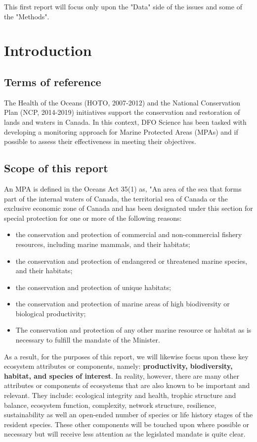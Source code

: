 \documentclass[letterpaper,portrait,11pt]{scrartcl}
\numberwithin{equation}{section}		%
\numberwithin{figure}{section}		%
\numberwithin{table}{section}				%
\begin{document}
This first report will focus only upon the "Data" side of the issues and some of the "Methods". 


\section{Introduction}

\subsection{Terms of reference}
The Health of the Oceans (HOTO, 2007-2012) and the National Conservation Plan (NCP, 2014-2019) initiatives support the conservation and restoration of lands and waters in Canada. In this context, DFO Science has been tasked with developing a monitoring approach for Marine Protected Areas (MPAs) and if possible to assess their effectiveness in meeting their objectives. 

\subsection{Scope of this report}
An MPA is defined in the Oceans Act 35(1) as, "An area of the sea that forms part of the internal waters of Canada, the territorial sea of Canada or the exclusive economic zone of Canada and has been designated under this section for special protection for one or more of the following reasons: 

\begin{itemize}
  \item the conservation and protection of commercial and non-commercial fishery resources, including marine mammals, and their habitats; 
  \item the conservation and protection of endangered or threatened marine species, and their habitats; 
  \item the conservation and protection of unique habitats; 
  \item the conservation and protection of marine areas of high biodiversity or biological productivity; 
  \item The conservation and protection of any other marine resource or habitat as is necessary to fulfill the mandate of the Minister.
\end{itemize}

As a result, for the purposes of this report, we will likewise focus upon these key ecosystem attributes or components, namely: \textbf{productivity, biodiversity, habitat, and  species of interest}. In reality, however, there are many other attributes or components of ecosystems that are also known to be important and relevant. They include: ecological integrity and health, trophic structure and balance, ecosystem function, complexity, network structure, resilience, sustainability as well an open-ended number of species or life history stages of the resident species. These other components will be touched upon where possible or necessary but will receive less attention as the legislated mandate is quite clear. 
\end{document}
